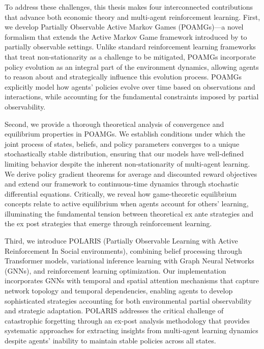 To address these challenges, this thesis makes four interconnected contributions that advance both economic theory and multi-agent reinforcement learning. First, we develop Partially Observable Active Markov Games (POAMGs)—a novel formalism that extends the Active Markov Game framework introduced by \citet{kim2022influencing} to partially observable settings. Unlike standard reinforcement learning frameworks that treat non-stationarity as a challenge to be mitigated, POAMGs incorporate policy evolution as an integral part of the environment dynamics, allowing agents to reason about and strategically influence this evolution process. POAMGs explicitly model how agents' policies evolve over time based on observations and interactions, while accounting for the fundamental constraints imposed by partial observability.

Second, we provide a thorough theoretical analysis of convergence and equilibrium properties in POAMGs. We establish conditions under which the joint process of states, beliefs, and policy parameters converges to a unique stochastically stable distribution, ensuring that our models have well-defined limiting behavior despite the inherent non-stationarity of multi-agent learning. We derive policy gradient theorems for average and discounted reward objectives and extend our framework to continuous-time dynamics through stochastic differential equations. Critically, we reveal how game-theoretic equilibrium concepts relate to active equilibrium when agents account for others' learning, illuminating the fundamental tension between theoretical ex ante strategies and the ex post strategies that emerge through reinforcement learning.

Third, we introduce POLARIS (Partially Observable Learning with Active Reinforcement In Social environments), combining belief processing through Transformer models, variational inference learning with Graph Neural Networks (GNNs), and reinforcement learning optimization. Our implementation incorporates GNNs with temporal and spatial attention mechanisms that capture network topology and temporal dependencies, enabling agents to develop sophisticated strategies accounting for both environmental partial observability and strategic adaptation. POLARIS addresses the critical challenge of catastrophic forgetting through an ex-post analysis methodology that provides systematic approaches for extracting insights from multi-agent learning dynamics despite agents' inability to maintain stable policies across all states.

